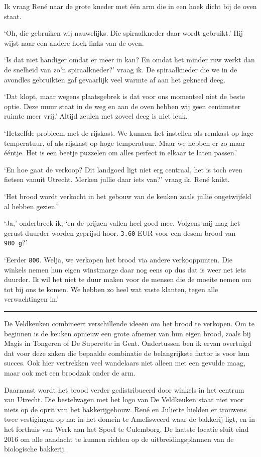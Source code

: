 \documentclass[
  11pt,
  dutch,
]{memoir}
\begin{document}
Ik vraag René naar de grote kneder met één arm die in een hoek dicht bij
de oven staat.

`Oh, die gebruiken wij nauwelijks. Die spiraalkneder daar wordt
gebruikt.' Hij wijst naar een andere hoek links van de oven.

`Is dat niet handiger omdat er meer in kan? En omdat het minder ruw
werkt dan de snelheid van zo'n spiraalkneder?' vraag ik. De
spiraalkneder die we in de avondles gebruikten gaf gevaarlijk veel
warmte af aan het gekneed deeg.

`Dat klopt, maar wegens plaatsgebrek is dat voor ons momenteel niet de
beste optie. Deze muur staat in de weg en aan de oven hebben wij geen
centimeter ruimte meer vrij.' Altijd zeulen met zoveel deeg is niet
leuk.

`Hetzelfde probleem met de rijskast. We kunnen het instellen als remkast
op lage temperatuur, of als rijskast op hoge temperatuur. Maar we hebben
er zo maar ééntje. Het is een beetje puzzelen om alles perfect in elkaar
te laten passen.'

`En hoe gaat de verkoop? Dit landgoed ligt niet erg centraal, het is
toch even fietsen vanuit Utrecht. Merken jullie daar iets van?' vraag
ik. René knikt.

`Het brood wordt verkocht in het gebouw van de keuken zoals jullie
ongetwijfeld al hebben gezien.'

`Ja,' onderbreek ik, `en de prijzen vallen heel goed mee. Volgens mij
mag het gerust duurder worden geprijsd hoor. \texttt{3.60} EUR voor een
desem brood van \texttt{900\ g}?'

`Eerder \texttt{800}. Welja, we verkopen het brood via andere
verkooppunten. Die winkels nemen hun eigen winstmarge daar nog eens op
dus dat is weer net iets duurder. Ik wil het niet te duur maken voor de
mensen die de moeite nemen om tot bij ons te komen. We hebben zo heel
wat vaste klanten, tegen alle verwachtingen in.'

\pfbreak

De Veldkeuken combineert verschillende ideeën om het brood te verkopen.
Om te beginnen is de keuken opnieuw een grote afnemer van hun eigen
brood, zoals bij Magis in Tongeren of De Superette in Gent. Ondertussen
ben ik ervan overtuigd dat voor deze zaken die bepaalde combinatie de
belangrijkste factor is voor hun succes. Ook hier vertrekken veel
wandelaars niet alleen met een gevulde maag, maar ook met een broodzak
onder de arm.

Daarnaast wordt het brood verder gedistribueerd door winkels in het
centrum van Utrecht. Die bestelwagen met het logo van De Veldkeuken
staat niet voor niets op de oprit van het bakkerijgebouw. René en
Juliette hielden er trouwens twee vestigingen op na: in het domein te
Amelisweerd waar de bakkerij ligt, en in het forthuis van Werk aan het
Spoel te Culemborg. De laatste locatie sluit eind 2016 om alle aandacht
te kunnen richten op de uitbreidingsplannen van de biologische bakkerij.
\end{document}
